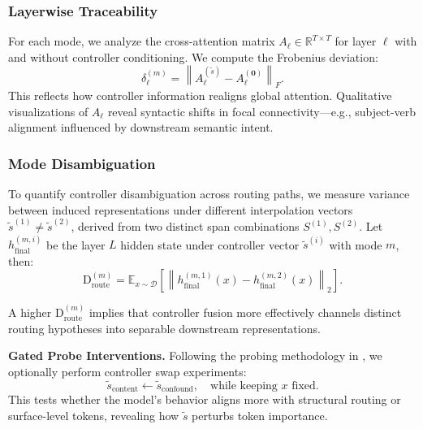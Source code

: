 \subsubsection*{Layerwise Traceability}

For each mode, we analyze the cross-attention matrix \(A_\ell \in \mathbb{R}^{T \times T}\) for layer \(\ell\) with and without controller conditioning. We compute the Frobenius deviation:
\[
\delta_\ell^{(m)} = \left\| A_\ell^{(\tilde{s})} - A_\ell^{(\mathbf{0})} \right\|_F.
\]
This reflects how controller information realigns global attention. Qualitative visualizations of \(A_\ell\) reveal syntactic shifts in focal connectivity—e.g., subject-verb alignment influenced by downstream semantic intent.

\subsubsection*{Mode Disambiguation}

To quantify controller disambiguation across routing paths, we measure variance between induced representations under different interpolation vectors \(\tilde{s}^{(1)} \ne \tilde{s}^{(2)}\), derived from two distinct span combinations \(S^{(1)}, S^{(2)}\). Let \(h_{\text{final}}^{(m, i)}\) be the layer \(L\) hidden state under controller vector \(\tilde{s}^{(i)}\) with mode \(m\), then:
\[
\mathrm{D}_{\text{route}}^{(m)} = \mathbb{E}_{x \sim \mathcal{D}} \left[ \left\| h_{\text{final}}^{(m, 1)}(x) - h_{\text{final}}^{(m, 2)}(x) \right\|_2 \right].
\]

A higher \(\mathrm{D}_{\text{route}}^{(m)}\) implies that controller fusion more effectively channels distinct routing hypotheses into separable downstream representations.

\vspace{0.75em}
\noindent\textbf{Gated Probe Interventions.} Following the probing methodology in \cite{vig2020investigating}, we optionally perform controller swap experiments:
\[
\tilde{s}_{\text{content}} \leftarrow \tilde{s}_{\text{confound}}, \quad \text{while keeping } x \text{ fixed}.
\]
This tests whether the model’s behavior aligns more with structural routing or surface-level tokens, revealing how \(\tilde{s}\) perturbs token importance.

